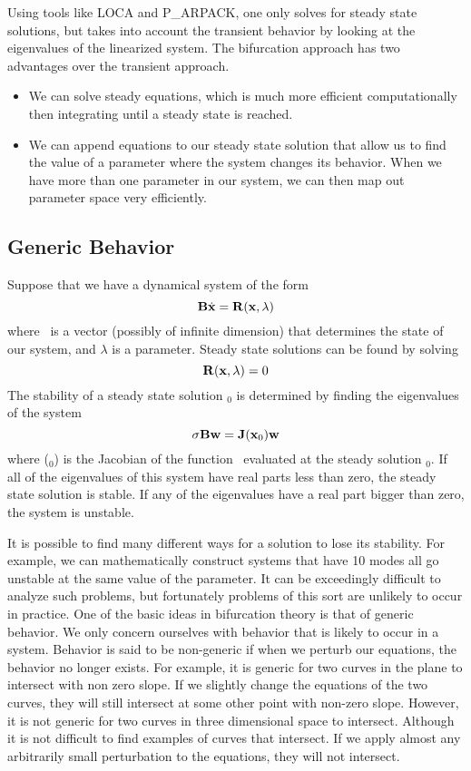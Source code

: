 Using tools like LOCA and P\_ARPACK, one only solves for steady state
solutions, but takes into account the  transient behavior by 
looking at the eigenvalues of the linearized system. 
The bifurcation approach has two advantages over the transient
approach.  
\begin{itemize}
\item We can solve steady equations, which is much more 
efficient computationally then integrating until a steady state is reached.  
\item  We can append equations to our steady state solution that
allow us to find the  value of a  parameter where the 
system changes its behavior.  When we have more than one
 parameter in our system, we can then map out parameter
space very efficiently. 
\end{itemize}

\subsection{Generic Behavior} 
Suppose that we have a dynamical system of the form
\begin{equation}
 {\bf B} \dot{{\bf x}} = {\bf R}({\bf x},\lambda) 
\end{equation} 
where \bfx\ is a vector (possibly of infinite dimension)
that determines the state of our system, and $\lambda$ is a 
parameter.  Steady state solutions can be found by solving
\begin{equation}
 {\bf R}({\bf x},\lambda)=0
\end{equation}  
The stability of a steady 
state solution \bfx$_0$ is determined by 
finding the eigenvalues of the system
\begin{equation}
 \sigma {\bf B} {\bf w} = {\bf J}({\bf x}_0) {\bf w}
\end{equation}
where \bfJ(\bfx$_0$) is the Jacobian of the function \bfR\
evaluated at the steady solution \bfx$_0$.  If all of the
eigenvalues of this system have real parts less than 
zero, the steady state solution is stable.  If any of the
eigenvalues have a real part bigger than zero, the 
system is unstable.  

It is possible to find many 
different ways for a solution to lose its stability.
For example, we can mathematically construct
  systems that have 10 modes all go
 unstable at the same value of the parameter.  It can be 
exceedingly difficult to analyze such problems, but fortunately
problems of this sort are unlikely to occur in practice. 
 One of the
 basic ideas in bifurcation
theory is that of generic behavior.  We only concern
 ourselves with behavior that is likely to occur in a system.  Behavior is 
said to be non-generic if when we perturb our equations, the
behavior no longer exists.  For example, it is generic for
two curves in the plane to intersect with non zero slope.
If we slightly change the equations of the two curves, they will
still intersect at some other point with non-zero slope.  
However, it is not generic for two curves in three dimensional 
space to intersect.  Although it is not difficult to find examples
of curves that intersect.  If we apply almost any
arbitrarily small perturbation to the equations, they
 will not intersect.

